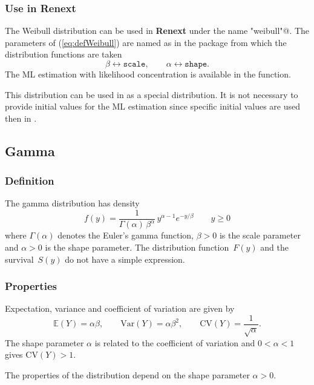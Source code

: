 \documentclass[a4paper]{report}
\newcommand{\pkg}[1]{\textbf{#1}}
\newcommand{\Esp}{\mathbb{E}}
\newcommand{\Var}{\textrm{Var}}
\begin{document}
\subsubsection*{Use in Renext}
The Weibull distribution  can be used in \pkg{Renext} under the name \verb@"weibull"@. The 
parameters of (\ref{eq:defWeibull}) are named as in the \verb@stats@ package from
which the distribution functions are taken
$$
   \beta \leftrightarrow \texttt{scale}, \qquad \alpha \leftrightarrow \texttt{shape}.
$$
The ML estimation with likelihood concentration is available in the 
\verb@fweibull@ function.

This distribution can be used in \verb@Renouv@ as a special 
distribution. It is not necessary to provide initial values for the ML estimation since 
specific initial values are used then in \verb@Renouv@.


\subsection{Gamma}
\subsubsection{Definition}
The gamma distribution  has density
\begin{equation}
  \label{eq:defGamma}
  f(y) = \frac{1}{\Gamma(\alpha) \,\beta^\alpha} \,y^{\alpha-1} e^{-y/\beta} \qquad y \geqslant 0
\end{equation}
where $\Gamma(\alpha)$ denotes the Euler's gamma function,
$\beta>0$ is the scale parameter and $\alpha>0$ is the shape parameter.
The distribution function~$F(y)$ and the survival~$S(y)$ do not have a simple expression.

\subsubsection{Properties}
Expectation, variance and coefficient of variation are given by
$$
   \Esp(Y)= \alpha \beta, \qquad \Var(Y) = \alpha \beta^2, \qquad
   \textrm{CV}(Y) = \frac{1}{\sqrt{\alpha}}.
$$
The shape parameter $\alpha$ is related to the coefficient of variation
and $0 < \alpha < 1$ gives $\textrm{CV}(Y)>1$.

\smallskip
The properties of the distribution depend on the shape parameter 
$\alpha>0$.
\end{document}
